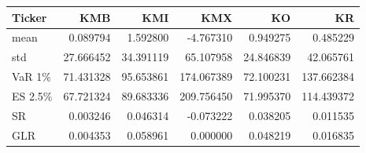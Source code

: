 \begin{tabular}{lrrrrr}
\toprule
Ticker & KMB & KMI & KMX & KO & KR \\
\midrule
mean & 0.089794 & 1.592800 & -4.767310 & 0.949275 & 0.485229 \\
std & 27.666452 & 34.391119 & 65.107958 & 24.846839 & 42.065761 \\
VaR 1\% & 71.431328 & 95.653861 & 174.067389 & 72.100231 & 137.662384 \\
ES 2.5\% & 67.721324 & 89.683336 & 209.756450 & 71.995370 & 114.439372 \\
SR & 0.003246 & 0.046314 & -0.073222 & 0.038205 & 0.011535 \\
GLR & 0.004353 & 0.058961 & 0.000000 & 0.048219 & 0.016835 \\
\bottomrule
\end{tabular}
